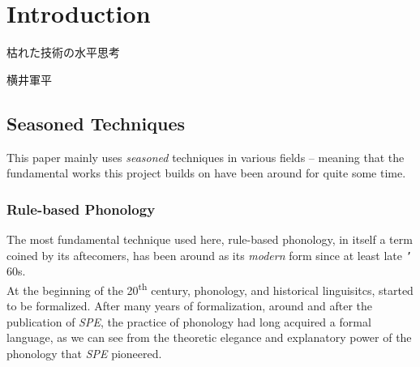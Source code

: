 \documentclass{report}[12pt]
\begin{document}
\pagebreak





\chapter{Introduction}

\epigraph{枯れた技術の水平思考\footnotemark}{横井軍平}

\section{Seasoned Techniques}

This paper mainly uses \emph{seasoned} techniques in various fields -- meaning that the fundamental works this project builds on have been around for quite some time. 

\subsection{Rule-based Phonology}

The most fundamental technique used here, rule-based phonology, in itself a term coined by its aftecomers, has been around as its \emph{modern} form since at least late \texttt{'}\kern-1pt 60s. \\
At the beginning of the 20\textsuperscript{th} century, phonology, and historical linguisitcs, started to be formalized. After many years of formalization, around and after the publication of \emph{SPE}, the practice of phonology had long acquired a formal language, as we can see from the theoretic elegance and explanatory power of the phonology that \emph{SPE} pioneered.
\end{document}
